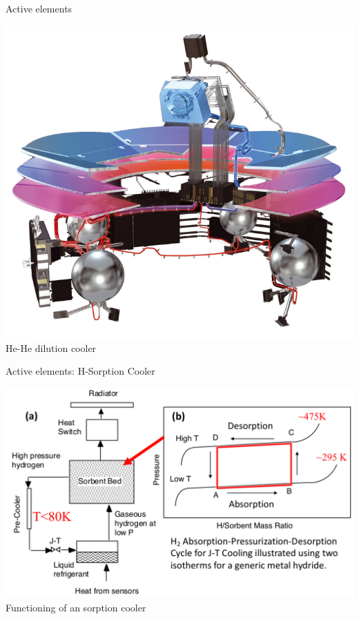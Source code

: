 \documentclass{cubeamer}
\begin{document}
\begin{frame}{Active elements}
\begin{minipage}{0.3\textwidth}
    \includegraphics[width=0.9\linewidth]{Figures/He_He_dilution.png} 
    \small \centering  He-He dilution cooler
\end{minipage}
\end{frame}




\begin{frame}{Active elements: H-Sorption Cooler}
\centering

    \includegraphics[width=0.7\linewidth]{Figures/Hsorption_cooler_diag.png} \\
    Functioning of an sorption cooler
\end{frame}
\end{document}
